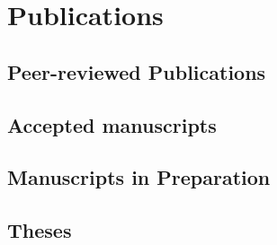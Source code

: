 \ifacademic
  \section{Publications}
  
  \subsection{Peer-reviewed Publications}
    \begin{refsection}
      \vspace{2mm}
      \onehalfspacing
      \nocite{
        Worman2020,
        DiBaldassarre2018,
        Breinl2017,
        GironsLopez2017,
        GironsLopez2016a,
        Mbanguka2016,
        GironsLopez2015
      }
      \printbibliography[heading=none]
    \end{refsection}

  \subsection{Accepted manuscripts}
    \begin{refsection}
      \vspace{2mm}
      \onehalfspacing
      \nocite{
        GironsLopez2020,
      }
      \printbibliography[heading=none]
    \end{refsection}
    
  \subsection{Manuscripts in Preparation}
    \begin{refsection}
      \vspace{2mm}
      \onehalfspacing
      \nocite{
        GironsLopez2020a,
      }
      \printbibliography[heading=none]
    \end{refsection}
  
  \subsection{Theses}
    \begin{refsection}
      \vspace{2mm}
      \onehalfspacing
      \nocite{
        GironsLopez2016,
        GironsLopez2011
      }
      \printbibliography[heading=none]
    \end{refsection}
  
  \newpage

